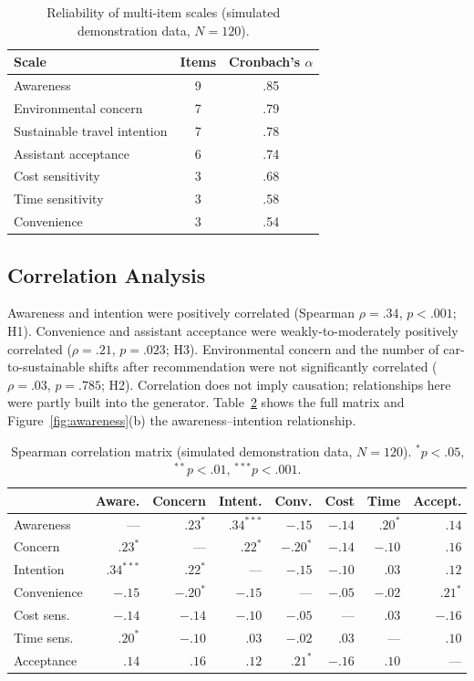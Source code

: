 \documentclass[11pt,a4paper]{article}
\begin{document}
\begin{table}[H]
\centering
\small
\caption{Reliability of multi-item scales (simulated demonstration data, $N = 120$).}
\label{tab:reliability}
\begin{tabular}{@{}lcc@{}}
\toprule
\textbf{Scale} & \textbf{Items} & \textbf{Cronbach's $\alpha$}\\
\midrule
Awareness & 9 & .85\\
Environmental concern & 7 & .79\\
Sustainable travel intention & 7 & .78\\
Assistant acceptance & 6 & .74\\
Cost sensitivity & 3 & .68\\
Time sensitivity & 3 & .58\\
Convenience & 3 & .54\\
\bottomrule
\end{tabular}
\end{table}

\subsection{Correlation Analysis}
Awareness and intention were positively correlated (Spearman $\rho = .34$, $p < .001$; H1).
Convenience and assistant acceptance were weakly-to-moderately positively correlated ($\rho = .21$,
$p = .023$; H3). Environmental concern and the number of car-to-sustainable shifts after
recommendation were not significantly correlated ($\rho = .03$, $p = .785$; H2). Correlation does not
imply causation; relationships here were partly built into the generator. Table~\ref{tab:corr} shows
the full matrix and Figure~\ref{fig:awareness}(b) the awareness--intention relationship.

\begin{table}[H]
\centering
\small
\caption{Spearman correlation matrix (simulated demonstration data, $N = 120$).
$^{*}p<.05$, $^{**}p<.01$, $^{***}p<.001$.}
\label{tab:corr}
\begin{tabular}{@{}lrrrrrrr@{}}
\toprule
 & Aware. & Concern & Intent. & Conv. & Cost & Time & Accept.\\
\midrule
Awareness & --- & $.23^{*}$ & $.34^{***}$ & $-.15$ & $-.14$ & $.20^{*}$ & $.14$\\
Concern & $.23^{*}$ & --- & $.22^{*}$ & $-.20^{*}$ & $-.14$ & $-.10$ & $.16$\\
Intention & $.34^{***}$ & $.22^{*}$ & --- & $-.15$ & $-.10$ & $.03$ & $.12$\\
Convenience & $-.15$ & $-.20^{*}$ & $-.15$ & --- & $-.05$ & $-.02$ & $.21^{*}$\\
Cost sens. & $-.14$ & $-.14$ & $-.10$ & $-.05$ & --- & $.03$ & $-.16$\\
Time sens. & $.20^{*}$ & $-.10$ & $.03$ & $-.02$ & $.03$ & --- & $.10$\\
Acceptance & $.14$ & $.16$ & $.12$ & $.21^{*}$ & $-.16$ & $.10$ & ---\\
\bottomrule
\end{tabular}
\end{table}
\end{document}
